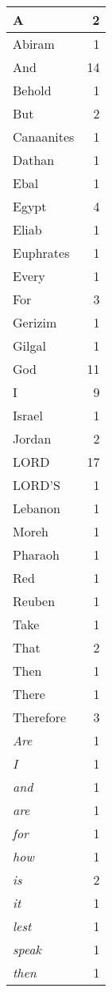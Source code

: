 \begin{center}
\begin{longtable}{l|r}
\hline \hline
\endlastfoot
A & 2 \\ \hline
Abiram & 1 \\ \hline
And & 14 \\ \hline
Behold & 1 \\ \hline
But & 2 \\ \hline
Canaanites & 1 \\ \hline
Dathan & 1 \\ \hline
Ebal & 1 \\ \hline
Egypt & 4 \\ \hline
Eliab & 1 \\ \hline
Euphrates & 1 \\ \hline
Every & 1 \\ \hline
For & 3 \\ \hline
Gerizim & 1 \\ \hline
Gilgal & 1 \\ \hline
God & 11 \\ \hline
I & 9 \\ \hline
Israel & 1 \\ \hline
Jordan & 2 \\ \hline
LORD & 17 \\ \hline
LORD'S & 1 \\ \hline
Lebanon & 1 \\ \hline
Moreh & 1 \\ \hline
Pharaoh & 1 \\ \hline
Red & 1 \\ \hline
Reuben & 1 \\ \hline
Take & 1 \\ \hline
That & 2 \\ \hline
Then & 1 \\ \hline
There & 1 \\ \hline
Therefore & 3 \\ \hline
\emph{Are} & 1 \\ \hline
\emph{I} & 1 \\ \hline
\emph{and} & 1 \\ \hline
\emph{are} & 1 \\ \hline
\emph{for} & 1 \\ \hline
\emph{how} & 1 \\ \hline
\emph{is} & 2 \\ \hline
\emph{it} & 1 \\ \hline
\emph{lest} & 1 \\ \hline
\emph{speak} & 1 \\ \hline
\emph{then} & 1 \\ \hline

\end{longtable}
\end{center}
